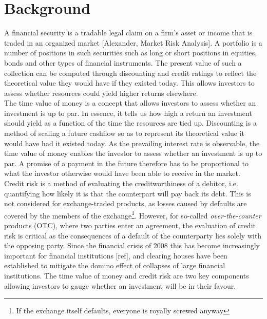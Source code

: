 \chapter{Background}

A financial security is a tradable legal claim on a firm's asset or income 
that is traded in an organized market [Alexander, Market Risk Analysis].
A portfolio is  a number of positions in such securities such as long or short 
positions in equities, bonds and other types of financial instruments. The 
present value of such a collection can be computed through discounting and 
credit ratings to  reflect the theoretical value they would have if they 
existed today. This allows investors to assess whether resources could yield 
higher returns elsewhere.\\

The time value of money is a concept that allows investors to assess whether an 
investment is up to par. In essence, it tells us how high a return an 
investment should yield as a function of the time the resources are tied up.
Discounting is a method of scaling a future cashflow so as to represent its 
theoretical value it would have had it existed today.
As the prevailing interest rate is observable, the time value of money enables 
the investor to assess whether an investment is up to par. A promise of a 
payment in the future therefore has to be proportional to what the investor 
otherwise would have been able to receive in the market.\\

Credit risk is a method of evaluating the creditworthiness of a debitor, i.e. 
quantifying how likely it is that the counterpart will pay back its debt. This 
is not considered for exchange-traded products, as losses caused by defaults 
are covered by the members of the exchange\footnote{If the exchange itself 
defaults, everyone is royally screwed anyway}. However, for so-called 
\emph{over-the-counter} products (OTC), where two parties enter an agreement, 
the evaluation of credit risk is critical as the consequences of a default of 
the counterparty lies solely with the opposing party. Since the financial 
crisis of 2008 this has become increasingly important for financial 
institutions [ref], and clearing houses have been established to mitigate the 
domino effect of collapses of large financial institutions.
The time value of money and credit risk are two key components allowing 
investors to gauge whether an investment will be in their favour.\\

